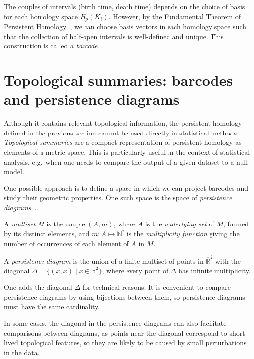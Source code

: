 \documentclass[a4paper,11pt,openany,extrafontsizes]{memoir}
\begin{document}
The couples of intervals (birth time, death time) depends on the
choice of basis for each homology space $H_p(K_i)$. However, by the
Fundamental Theorem of Persistent
Homology~\cite{zomorodian_computing_2005}, we can choose basis vectors
in each homology space such that the collection of half-open intervals
is well-defined and unique. This construction is called a
\emph{barcode}~\cite{carlsson_topology_2009}.

\section{Topological summaries: barcodes and persistence diagrams}%
\label{sec:topol-summ}

Although it contains relevant topological information, the persistent
homology defined in the previous section cannot be used directly in
statistical methods. \emph{Topological summaries} are a compact
representation of persistent homology as elements of a metric
space. This is particularly useful in the context of statistical
analysis, e.g.\ when one needs to compare the output of a given
dataset to a null model.

One possible approach is to define a space in which we can project
barcodes and study their geometric properties. One such space is the
space of \emph{persistence
  diagrams}~\cite{edelsbrunner_computational_2010}.

\begin{defn}[Multiset]
  A \emph{multiset} $M$ is the couple $(A, m)$, where $A$ is the
  \emph{underlying set} of $M$, formed by its distinct elements, and
  $m : A\mapsto\mathbb{N}^*$ is the \emph{multiplicity function}
  giving the number of occurrences of each element of $A$ in $M$.
\end{defn}

\begin{defn}
  A \emph{persistence diagram} is the union of a finite multiset of
  points in $\overline{\mathbb{R}}^2$ with the diagonal
  $\Delta = \{(x,x) \;|\; x\in\mathbb{R}^2\}$, where every point of
  $\Delta$ has infinite multiplicity.
\end{defn}

One adds the diagonal $\Delta$ for technical reasons. It is convenient
to compare persistence diagrams by using bijections between them, so
persistence diagrams must have the same cardinality.

In some cases, the diagonal in the persistence diagrams can also
facilitate comparisons between diagrams, as points near the diagonal
correspond to short-lived topological features, so they are likely to
be caused by small perturbations in the data.
\end{document}
